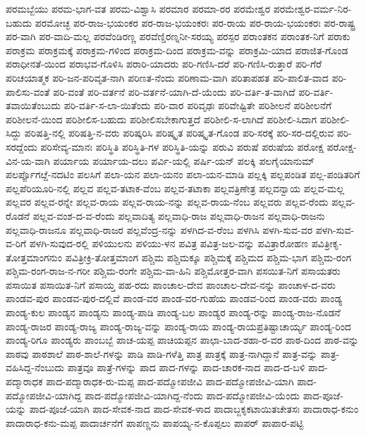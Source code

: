 {ಪರಮಬ್ಬೆಯು
ಪರಮ-ಭಾಗ-ವತ
ಪರಮ-ವಿಶ್ವಾಸಿ
ಪರಮಾರ
ಪರಮಾ-ರರ
ಪರಮೇಶ್ವರ
ಪರಮೇಶ್ವರ-ವರ್ಮ-ನಿರ-ಬಹುದು
ಪರಮೋಚ್ಛ
ಪರ-ರಾಜ-ಭಯಂಕರ
ಪರ-ರಾಜ-ಭಯಂಕರಃ
ಪರ-ರಾಯ
ಪರ-ರಾಯ-ಭಯಂಕರಃ
ಪರ-ರಾಷ್ಟ್ರ
ಪರ-ವಾಗಿ
ಪರ-ವಾದಿ-ಮಲ್ಲ
ಪರವೆಂಡಿರಣ್ಣ
ಪರವೆಣ್ಡಿರಣ್ನನೀ-ಸರಯ್ಯ
ಪರಸ್ಪರ
ಪರಾಂತಕನ
ಪರಾಂತಕ-ನಿಗೆ
ಪರಾಕು
ಪರಾಕ್ರಮ
ಪರಾಕ್ರಮಕ್ಕೆ
ಪರಾಕ್ರಮ-ಗಳಿಂದ
ಪರಾಕ್ರಮ-ದಿಂದ
ಪರಾಕ್ರಮ-ವನ್ನು
ಪರಾಕ್ರಮಿ-ಯಾದ
ಪರಾಜಿತ-ಗೊಂಡ
ಪರಾಧೀನತೆ-ಯಿಂದ
ಪರಾಭವ-ಗೊಳಿಸಿ
ಪರಾರಿ-ಯಾದರು
ಪರಿ-ಗಣಿಸಿ-ದರೆ
ಪರಿ-ಗಣಿಸಿ-ರುತ್ತಾರೆ
ಪರಿ-ಗೆರೆ
ಪರಿಚಯಾತ್ಮಕ
ಪರಿ-ಜನ-ಪರಿವೃತ-ನಾಗಿ
ಪರಿಣತ-ನೆಂದು
ಪರಿಣಾಮ-ವಾಗಿ
ಪರಿತಾಪಹತ
ಪರಿ-ಪಾಲಿತ-ವಾದ
ಪರಿ-ಪಾಲಿಸು-ವಂತೆ
ಪರಿ-ವಂತೆ
ಪರಿ-ವರ್ತನೆ
ಪರಿ-ವರ್ತನೆ-ಯಾಗಿ-ದೆ-ಯೆಂದು
ಪರಿ-ವರ್ತಿ-ತ-ವಾಗಿದೆ
ಪರಿ-ವರ್ತಿ-ತವಾಯಿತೆಂಬುದು
ಪರಿ-ವರ್ತಿ-ಸ-ಲಾ-ಯಿತೆಂದು
ಪರಿ-ವಾರ
ಪರಿವೃಢಃ
ಪರಿವೇಷ್ಟಿತೇ
ಪರಿಶೀಲನೆ
ಪರಿಶೀಲನೆಗೆ
ಪರಿಶೀಲನೆ-ಯಿಂದ
ಪರಿಶೀಲಿಸ-ಬಹುದು
ಪರಿಶೀಲಿಸಬೇಕಾಗುತ್ತದೆ
ಪರಿಶೀಲಿ-ಸ-ಲಾಗಿದೆ
ಪರಿಶೀಲಿ-ಸಿದಾಗ
ಪರಿಶೀಲಿ-ಸಿದ್ದು
ಪರಿಷತ್ತಿ-ನಲ್ಲಿ
ಪರಿಷತ್ತಿ-ನ-ವರು
ಪರಿಷ್ಕರಿಸಿ
ಪರಿಷ್ಕೃತ
ಪರಿಷ್ಕೃತ-ಗೊಂಡ
ಪರಿ-ಸರಕ್ಕೆ
ಪರಿ-ಸರ-ದಲ್ಲಿರುವ
ಪರಿ-ಸರದ್ದೆಂದು
ಪರಿಸೇವ್ಯ-ಮಾನಃ
ಪರಿಸ್ಥಿತಿ
ಪರಿಸ್ಥಿತಿ-ಗಳ
ಪರಿಸ್ಥಿತಿ-ಯನ್ನು
ಪರುವಿ
ಪರುಷೆ
ಪರುಷೆಯ
ಪರೋಕ್ಷ
ಪರೋಕ್ಷ-ವಿನ-ಯ-ವಾಗಿ
ಪರ್ಯಾಯ
ಪರ್ಯಾಯ-ದಲು
ಪರ್ವಿ-ಯಲ್ಲಿ
ಪರ್ಷಿ-ಯನ್
ಪಲಕ್ಕಿ
ಪಲಗೈಯಾನುಮ್
ಪಲರ್ಪ್ಪೊಗೞ್ದೆ-ನದಟಿಂ
ಪಲಸಿಗೆ
ಪಲಾ-ಯನ
ಪಲಾ-ಯನಂ
ಪಲಾ-ಯನ-ಮಾಡಿ
ಪಲ್ಲಕ್ಕಿ
ಪಲ್ಲಪಂಡಿತ
ಪಲ್ಲ-ಪಂಡಿತರಿಗೆ
ಪಲ್ಲಪೆರಿಯೂರಿ-ನಲ್ಲಿ
ಪಲ್ಲವ
ಪಲ್ಲವ-ತಟಾಕ-ವೆಂಬ
ಪಲ್ಲವ-ತಟಾಕಾ
ಪಲ್ಲವತ್ರಿಣೇತ್ರ
ಪಲ್ಲವನ್ವಾಯ
ಪಲ್ಲವ-ಮಲ್ಲ
ಪಲ್ಲವರ
ಪಲ್ಲವ-ರನ್ನೇ
ಪಲ್ಲವ-ರಾಯ
ಪಲ್ಲವ-ರಾಯ-ನನ್ನು
ಪಲ್ಲವ-ರಾಯ-ನೆಂಬ
ಪಲ್ಲವರು
ಪಲ್ಲವ-ರೆಂದು
ಪಲ್ಲವ-ರೊಡನೆ
ಪಲ್ಲವ-ವಂಶ-ದ-ವ-ರೆಂದು
ಪಲ್ಲವಾದಿತ್ಯ
ಪಲ್ಲವಾಧಿ-ರಾಜ
ಪಲ್ಲವಾಧಿ-ರಾಜನ
ಪಲ್ಲವಾಧಿ-ರಾಜನು
ಪಲ್ಲವಾಧಿ-ರಾಜನೂ
ಪಲ್ಲವಾಧಿ-ರಾಜರ
ಪಲ್ಲವೆಂದ್ರ-ನನ್ನು
ಪಳಗಿದ-ವ-ರೆಂಬ
ಪಳಗಿಸಿ
ಪಳಗಿ-ಸುವ-ವರ
ಪಳಗಿ-ಸುವ-ವ-ರಿಗೆ
ಪಳಗಿ-ಸುವುದ-ರಲ್ಲಿ
ಪಳಿಯುಲನು
ಪಳಿಯು-ಳನ
ಪವಿತ್ರ
ಪವಿತ್ರ-ಜಲ-ವನ್ನು
ಪವಿತ್ರಾರೋಹಣ
ಪವಿತ್ರೀಕೃ-ತೋತ್ತಮಾಂಗನುಂ
ಪವಿತ್ರೀಕ್ರಿ-ತೋತ್ತಮಾಂಗ
ಪಶ್ಚಿಮ
ಪಶ್ಚಿಮಕ್ಕೂ
ಪಶ್ಚಿಮಕ್ಕೆ
ಪಶ್ಚಿಮದ
ಪಶ್ಚಿಮ-ಭಾಗ
ಪಶ್ಚಿಮ-ರಂಗ
ಪಶ್ಚಿಮ-ರಂಗ-ರಾಜ-ನ-ಗರೀ
ಪಶ್ಚಿಮ-ರಂಗೇ
ಪಶ್ಚಿಮ-ವಾ-ಹಿನಿ
ಪಶ್ಚಿಮೋತ್ತರ-ವಾಗಿ
ಪಸಯಿತ-ನಿಗೆ
ಪಸಾಯತರು
ಪಸಾಯಿತ
ಪಸಾಯಿತ-ನಿಗೆ
ಪಸಾಯ್ತ
ಪಹ-ರದು
ಪಾಂಚಾಲ-ದೇವ
ಪಾಂಚಾಲ-ದೇವ-ನನ್ನು
ಪಾಂಚಾಳ-ದ-ವರು
ಪಾಂಡವ-ಪುರ
ಪಾಂಡವ-ಪುರ-ದಲ್ಲಿವೆ
ಪಾಂಡ-ವರ
ಪಾಂಡ-ವರ-ಗುಹೆಯ
ಪಾಂಡವ-ರಿಂದ
ಪಾಂಡ-ವರು
ಪಾಂಡ್ಯ
ಪಾಂಡ್ಯ-ಕುಲ
ಪಾಂಡ್ಯನ
ಪಾಂಡ್ಯನು
ಪಾಂಡ್ಯ-ಪಾಡಿ
ಪಾಂಡ್ಯ-ಬಲ
ಪಾಂಡ್ಯರ
ಪಾಂಡ್ಯ-ರನ್ನು
ಪಾಂಡ್ಯ-ರಾಜ-ನೊಡನೆ
ಪಾಂಡ್ಯ-ರಾಜರ
ಪಾಂಡ್ಯ-ರಾಜ್ಯ
ಪಾಂಡ್ಯ-ರಾಜ್ಯ-ವನ್ನು
ಪಾಂಡ್ಯ-ರಾಯ
ಪಾಂಡ್ಯ-ರಾಯಪ್ರತಿಷ್ಟಾಚಾರ್ಯ್ಯ
ಪಾಂಡ್ಯ-ರಿಂದ
ಪಾಂಡ್ಯ-ರಿಗೂ
ಪಾಂಡ್ಯರು
ಪಾಂಬಬ್ಬೆ
ಪಾಚ-ಯಪ್ಪ
ಪಾಚಿಯಪ್ಪನ
ಪಾಛಾ-ಬಾದ-ಶಹಾ-ರ-ವರ
ಪಾಠ-ದಿಂದ
ಪಾಠ-ವನ್ನು
ಪಾಠವು
ಪಾಠಶಾಲೆ
ಪಾಠ-ಶಾಲೆ-ಗಳನ್ನು
ಪಾಡಿ
ಪಾಡಿ-ಗಳೆತ್ತಿ
ಪಾತ್ರ
ಪಾತ್ರಕ್ಕೆ
ಪಾತ್ರ-ನಾಗಿದ್ದಾನೆ
ಪಾತ್ರ-ವನ್ನು
ಪಾತ್ರ-ವಹಿಸಿದ್ದ-ನೆಂಬುದು
ಪಾತ್ರವೂ
ಪಾತ್ರೆ-ಗಳನ್ನು
ಪಾದ
ಪಾದ-ಗಳನ್ನು
ಪಾದ-ಚಾರಕ-ನಾದ
ಪಾದ-ದ-ಬಳಿ
ಪಾದ-ಪದ್ಮಾರಾಧಕ
ಪಾದ-ಪದ್ಮಾರಾಧಕ-ರು-ಮಪ್ಪ
ಪಾದ-ಪದ್ಮೋಪಜೀವಿ
ಪಾದ-ಪದ್ಮೋಪಜೀವಿ-ಯಾಗಿ
ಪಾದ-ಪದ್ಮೋಪಜೀವಿ-ಯಾಗಿದ್ದ
ಪಾದ-ಪದ್ಮೋಪಜೀವಿ-ಯಾಗಿದ್ದ-ನೆಂದು
ಪಾದ-ಪದ್ಮೋಪಜೀವಿ-ಯೆಂದು
ಪಾದ-ಪೂಜೆ-ಯನ್ನು
ಪಾದ-ಪೂಜೆ-ಯಾಗಿ
ಪಾದ-ಸೇವಕ-ನಾದ
ಪಾದ-ಸೇವಕ-ಳಾದ
ಪಾದಾಬ್ಜಕೃಕಟಾಯಿತಚೇತಸಃ
ಪಾದಾರಾಧ-ಕನುಂ
ಪಾದಾರಾಧ-ಕನು-ಮಪ್ಪ
ಪಾದಾರ್ಚನೆಗೆ
ಪಾಪಣ್ಣನು
ಪಾಪಯ್ಯ-ನ-ಕೊಪ್ಪಲು
ಪಾಪರ್
ಪಾಪಾರ-ಪಟ್ಟಿ
}
